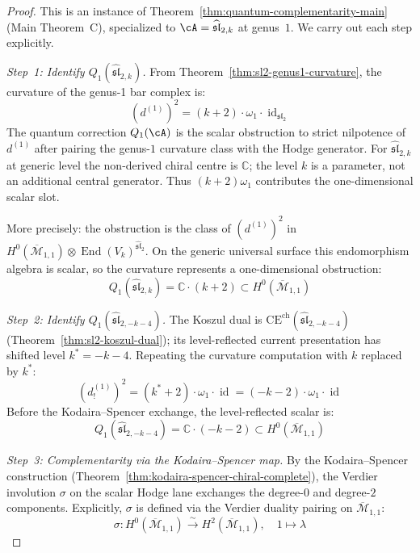 \begin{proof}
This is an instance of Theorem~\ref{thm:quantum-complementarity-main} (Main Theorem~C), specialized to $\cA = \widehat{\mathfrak{sl}}_{2,k}$ at genus~$1$. We carry out each step explicitly.

\emph{Step~1: Identify $Q_1(\widehat{\mathfrak{sl}}_{2,k})$.}
From Theorem~\ref{thm:sl2-genus1-curvature}, the curvature of the genus-1 bar complex is:
\begin{equation}
(d^{(1)})^2 = (k+2) \cdot \omega_1 \cdot \operatorname{id}_{\mathfrak{sl}_2}
\end{equation}
The quantum correction $Q_1(\cA)$ is the scalar obstruction to strict
nilpotence of $d^{(1)}$ after pairing the genus-$1$ curvature class with
the Hodge generator.  For $\widehat{\mathfrak{sl}}_{2,k}$ at generic
level the non-derived chiral centre is $\mathbb{C}$; the level $k$ is a
parameter, not an additional central generator.  Thus
$(k+2)\omega_1$ contributes the one-dimensional scalar slot.

More precisely: the obstruction is the class of $(d^{(1)})^2$ in
$H^0(\overline{\mathcal{M}}_{1,1}) \otimes
\operatorname{End}(V_k)^{\widehat{\mathfrak{sl}}_2}$.  On the generic
universal surface this endomorphism algebra is scalar, so the curvature
represents a one-dimensional obstruction:
\begin{equation}
Q_1(\widehat{\mathfrak{sl}}_{2,k}) = \mathbb{C} \cdot (k+2) \subset H^0(\overline{\mathcal{M}}_{1,1})
\end{equation}

\emph{Step~2: Identify $Q_1(\widehat{\mathfrak{sl}}_{2,-k-4})$.}
The Koszul dual is
\(\mathrm{CE}^{\mathrm{ch}}(\widehat{\mathfrak{sl}}_{2,-k-4})\)
(Theorem~\ref{thm:sl2-koszul-dual}); its level-reflected current
presentation has shifted level $k^* = -k-4$. Repeating the curvature
computation with $k$ replaced by $k^*$:
\begin{equation}
(d^{(1)}_!)^2 = (k^* + 2) \cdot \omega_1 \cdot \operatorname{id} = (-k-2) \cdot \omega_1 \cdot \operatorname{id}
\end{equation}
Before the Kodaira--Spencer exchange, the level-reflected scalar is:
\begin{equation}
Q_1(\widehat{\mathfrak{sl}}_{2,-k-4}) = \mathbb{C} \cdot (-k-2) \subset H^0(\overline{\mathcal{M}}_{1,1})
\end{equation}

\emph{Step~3: Complementarity via the Kodaira--Spencer map.}
By the Kodaira--Spencer construction
(Theorem~\ref{thm:kodaira-spencer-chiral-complete}), the Verdier
involution $\sigma$ on the scalar Hodge lane exchanges the degree-$0$
and degree-$2$ components. Explicitly, $\sigma$ is defined via the
Verdier duality pairing on $\overline{\mathcal{M}}_{1,1}$:
\begin{equation}
\sigma: H^0(\overline{\mathcal{M}}_{1,1}) \xrightarrow{\;\sim\;} H^2(\overline{\mathcal{M}}_{1,1}), \quad 1 \mapsto \lambda
\end{equation}


\end{proof}
